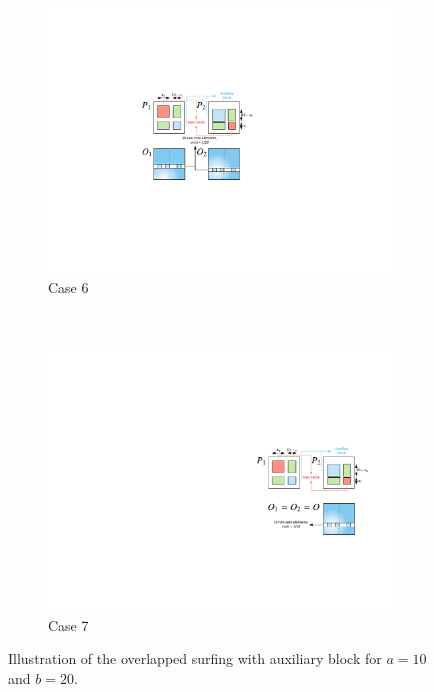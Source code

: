 	
	\begin{figure}
		\centering
		\begin{subfigure}[b]{0.22\textwidth}
			\includegraphics[width=\textwidth]{./img/case6-2}
			\caption{Case 6}
			\label{fig:case6}
		\end{subfigure}
		~ %
		\begin{subfigure}[b]{0.22\textwidth}
			\includegraphics[width=\textwidth]{./img/case7-2}
			\caption{Case 7}
			\label{fig:case7}
		\end{subfigure}
		\caption{Illustration of the overlapped surfing with auxiliary block for $a = 10$ and $b = 20$.}\label{fig:osurfau}
	\end{figure}
	
